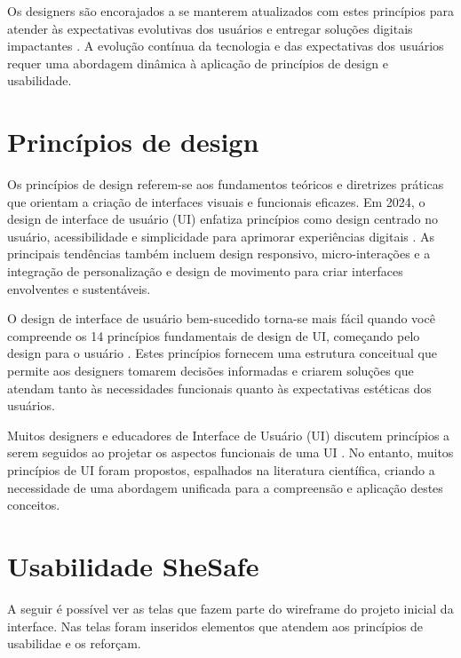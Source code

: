 Os designers são encorajados a se manterem atualizados com estes princípios para atender às expectativas evolutivas dos usuários e entregar soluções digitais impactantes \cite{medium_ui_principles_2025}. A evolução contínua da tecnologia e das expectativas dos usuários requer uma abordagem dinâmica à aplicação de princípios de design e usabilidade.

\section{Princípios de design}

Os princípios de design referem-se aos fundamentos teóricos e diretrizes práticas que orientam a criação de interfaces visuais e funcionais eficazes. Em 2024, o design de interface de usuário (UI) enfatiza princípios como design centrado no usuário, acessibilidade e simplicidade para aprimorar experiências digitais \cite{slideshare_ui_principles_2024}. As principais tendências também incluem design responsivo, micro-interações e a integração de personalização e design de movimento para criar interfaces envolventes e sustentáveis.

O design de interface de usuário bem-sucedido torna-se mais fácil quando você compreende os 14 princípios fundamentais de design de UI, começando pelo design para o usuário \cite{uxpin_ui_principles}. Estes princípios fornecem uma estrutura conceitual que permite aos designers tomarem decisões informadas e criarem soluções que atendam tanto às necessidades funcionais quanto às expectativas estéticas dos usuários.

Muitos designers e educadores de Interface de Usuário (UI) discutem princípios a serem seguidos ao projetar os aspectos funcionais de uma UI \cite{tandfonline_ui_principles}. No entanto, muitos princípios de UI foram propostos, espalhados na literatura científica, criando a necessidade de uma abordagem unificada para a compreensão e aplicação destes conceitos.

\section{Usabilidade SheSafe}

A seguir é possível ver as telas que fazem parte do wireframe do projeto inicial da interface. Nas telas foram inseridos elementos que atendem aos princípios de usabilidae e os reforçam.

